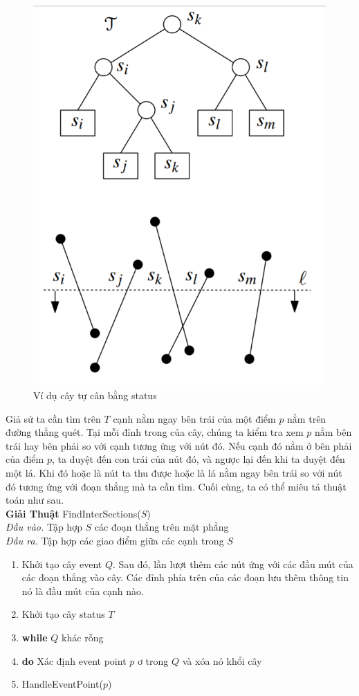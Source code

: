 \documentclass[15pt]{article}
\begin{document}
\begin{figure}[h!]
\centering
\includegraphics[scale=0.35]{./status_tree.png}
\caption{Ví dụ cây tự cân bằng status}
\label{fig:status tree exampels}
\end{figure}

Giả sử ta cần tìm trên $T$ cạnh nằm ngay bên trái của một điểm $p$ nằm trên đường thẳng quét. Tại mỗi đỉnh trong của cây, chúng ta kiểm tra xem $p$ nằm bên trái hay bên phải so với cạnh tương ứng với nút đó. Nếu cạnh đó nằm ở bên phải của điểm $p$, ta duyệt đến con trái của nút đó, và ngược lại đến khi ta duyệt đến một lá. Khi đó hoặc là nút ta thu được hoặc là lá nằm ngay bên trái so với nút đó tương ứng với đoạn thẳng mà ta cần tìm. Cuối cùng, ta có thể miêu tả thuật toán như sau. \\

\textbf{Giải Thuật} FindInterSections($S$) \\
\quad \textit{Đầu vào.} Tập hợp $S$ các đoạn thẳng trên mặt phẳng \\
\quad \textit{Đầu ra.} Tập hợp các giao điểm giữa các cạnh trong $S$
\begin{enumerate}
\item Khởi tạo cây event $Q$. Sau đó, lần lượt thêm các nút ứng với các đầu mút của các đoạn thẳng vào cây. Các đỉnh phía trên của các đoạn lưu thêm thông tin nó là đầu mút của cạnh nào.
\item Khởi tạo cây status $T$
\item \textbf{while} $Q$ khác rỗng
\item \quad \textbf{do} Xác định event point $p$ ơ trong $Q$ và xóa nó khổi cây
\item \quad \quad HandleEventPoint($p$)
\end{enumerate}
\end{document}
